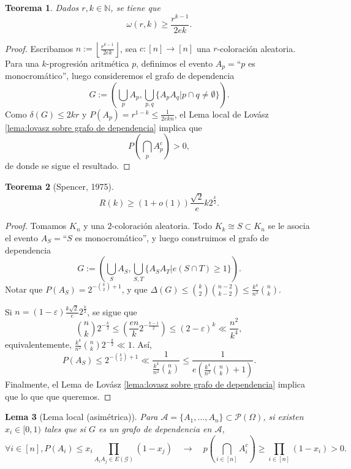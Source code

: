 \documentclass[12pt]{report}
\theoremstyle{plain}
\newtheorem{theorem}{Teorema}[section]
\newtheorem{lemma}[theorem]{Lema}
\theoremstyle{definition}
\newcommand{\naturals}{\mathbb{N}}
\newcommand{\floor}[1]{\left\lfloor #1  \right\rfloor}
\begin{document}
\begin{theorem}
Dados $r,k \in \naturals$, se tiene que
\[
    \omega (r,k) \geq \frac{r^{k-1}}{2 e k}.
\]
\end{theorem}
\begin{proof}
Escribamos $n := \floor{\frac{r^{k-1}}{2 e k}}$, sea $c : [n] \to [n]$ una $r$-coloración aleatoria. Para una $k$-progresión aritmética $p$, definimos el evento $A_p = $``$p$ es monocromático'', luego consideremos el grafo de dependencia
\[
    G := \left ( \bigcup_{p} A_p , \bigcup_{p, q} \{A_p A_q | p \cap q \neq \emptyset\} \right ).
\]
Como $\delta (G) \leq 2 k r$ y $P(A_p) = r^{1-k} \leq \frac{1}{2 e k n}$, el Lema local de Lovász \ref{lema:lovasz sobre grafo de dependencia} implica que
\[
    P(\bigcap_{p} A_p^c) > 0,
\]
de donde se sigue el resultado.
\end{proof}

\begin{theorem}[Spencer, 1975]
\[
    R(k) \geq (1 + o(1)) \frac{\sqrt 2}{e} k 2^{\frac k 2}.
\]

\end{theorem}
\begin{proof}
Tomamos $K_n$ y una $2$-coloración aleatoria. Todo $K_k \cong S \subset K_n$ se le asocia el evento $A_S = $``$S$ es monocromático'', y luego construimos el grafo de dependencia
\[
    G:= \left ( \bigcup_S A_S, \bigcup_{S,T} \{A_S A_T | e(S \cap  T) \geq 1\} \right ).
\]
Notar que $P(A_S) = 2^{- \binom k 2 + 1}$, y que $\Delta (G) \leq \binom k 2 \binom{n-2}{k-2} \leq \frac{k^4}{n^2}\binom n k$.

Si $n = (1 - \varepsilon) \frac{k \sqrt 2}{e} 2^{\frac k 2}$, se sigue que
\[
    \binom n k 2^{- \frac k 2} \leq \left ( \frac{e n}{k} 2^{- \frac {k-1}2} \right ) \leq (2- \varepsilon)^k \ll \frac{n^2}{k^4},
\]
equivalentemente, $\frac{k^4}{n^2} \binom n k 2^{- \frac k 2} \ll 1$.
Así,
\[
    P(A_S) \leq 2^{- \binom k 2 + 1} \ll \frac{1}{\frac{k^4}{n^2} \binom n k} \leq \frac{1}{e \left ( \frac{k^4}{n^2} \binom n k +  1 \right )}.
\]
Finalmente, el Lema de Lovász \ref{lema:lovasz sobre grafo de dependencia} implica que lo que que queremos.
\end{proof}


\begin{lemma}[Lema local (asimétrica)]\label{lema:lema local asimetrica}
Para $\mathcal A = \{A_1, \ldots, A_n\} \subset \mathcal P (\Omega)$, si existen $x_i \in [0, 1)$ tales que si $G$ es un grafo de dependencia en $\mathcal A$,
\[
    \forall i \in [n] , P(A_i) \leq x_i \prod_{A_i A_j \in E(\mathcal G)} (1 - x_j) \quad \longrightarrow \quad p (\bigcap_{i \in [n]} A_i^c) \geq \prod_{i \in [n]} (1-x_i) > 0.
\]
\end{lemma}
\end{document}
